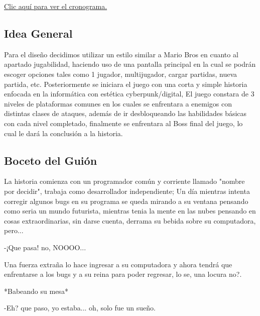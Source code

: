 \documentclass{article}
\begin{document}
        \vspace{0.3cm}
        
        \begin{flushleft}
        \href{https://spangle-prune-66e.notion.site/10b2778c1ce2479b88289a3ae453be1d?v=0732ac7241e9473ebe7c90af682b0ed8}{Clic aquí para ver el cronograma.}
        \end{flushleft}
        
        \subsection{Idea General}
        Para el diseño decidimos utilizar un estilo similar a Mario Bros en cuanto al apartado jugabilidad, haciendo uso de una pantalla principal en la cual se podrán escoger opciones tales como 1 jugador, multijugador, cargar partidas, nueva partida, etc. Posteriormente se iniciara el juego con una corta y simple historia enfocada en la informática con estética cyberpunk/digital, El juego constara de 3 niveles de plataformas comunes en los cuales se enfrentara a enemigos con distintas clases de ataques, además de ir desbloqueando las habilidades básicas con cada nivel completado, finalmente se enfrentara al Boss final del juego, lo cual le dará la conclusión a la historia.
        
        \subsection{Boceto del Guión}
        La historia comienza con un programador común y corriente llamado "nombre por decidir", trabaja como desarrollador independiente; Un día mientras intenta corregir algunos bugs en su programa se queda mirando a su ventana pensando como seria un mundo futurista, mientras tenia la mente en las nubes pensando en cosas extraordinarias, sin darse cuenta, derrama su bebida sobre su computadora, pero...
        
        \begin{flushleft}
        -¡Que pasa! no, NOOOO...
        \end{flushleft}
        
        Una fuerza extraña lo hace ingresar a su computadora y ahora tendrá que enfrentarse a los bugs y a su reina para poder regresar, lo se, una locura no?.
         
        \begin{flushleft}
        
        *Babeando su mesa*
        \vspace{0.1cm}
        
        -Eh? que paso, yo estaba... oh, solo fue un sueño.
        \end{flushleft}
        
\end{document}
